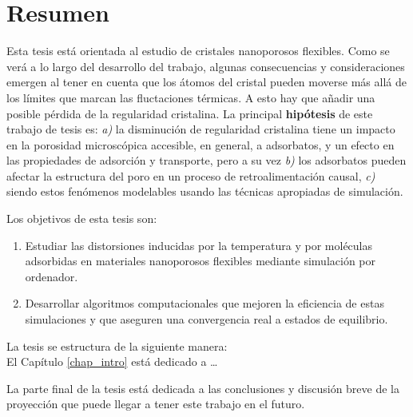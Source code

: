 \chapter*{\textbf{Resumen}}
Esta tesis está orientada al estudio de cristales nanoporosos flexibles. Como se verá a lo largo del desarrollo del trabajo, algunas consecuencias y consideraciones emergen al tener en cuenta que los átomos del cristal pueden moverse más allá de los límites que marcan las fluctaciones térmicas. A esto hay que añadir una posible pérdida de la regularidad cristalina. La principal \textbf{hipótesis} de este trabajo de tesis es: \textit{a)} la disminución de regularidad cristalina tiene un impacto en la porosidad microscópica accesible, en general, a adsorbatos, y un efecto en las propiedades de adsorción y transporte, pero a su vez \emph{b)} los adsorbatos pueden afectar la estructura del poro en un proceso de retroalimentación causal, \emph{c)} siendo estos fenómenos modelables usando las técnicas apropiadas de simulación.


Los objetivos de esta tesis son:
\begin{enumerate}
\item Estudiar las distorsiones inducidas por la temperatura y por moléculas adsorbidas en materiales nanoporosos flexibles mediante simulación por ordenador.
\item Desarrollar algoritmos computacionales que mejoren la eficiencia de estas simulaciones y que aseguren una convergencia real a estados de equilibrio.
\end{enumerate}


La tesis se estructura de la siguiente manera:\\

El Capítulo \ref{chap_intro} está dedicado a \ldots

La parte final de la tesis está dedicada a las conclusiones y discusión breve de la proyección que puede llegar a tener este trabajo en el futuro.
